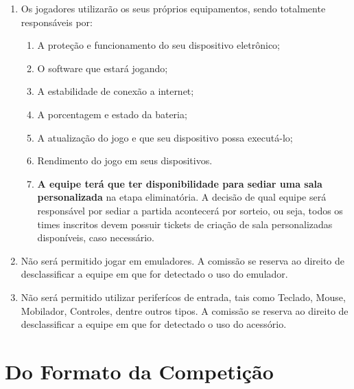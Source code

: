 \begin{enumerate}[start=1,label={\bfseries Art. \arabic*$^\circ$ - }, resume]
    \item Os jogadores utilizarão os seus próprios equipamentos, sendo totalmente
    responsáveis por:
\begin{enumerate}[label={\bfseries \Roman* - }]
        \item A proteção e funcionamento do seu dispositivo eletrônico;
        \item O software que estará jogando;
        \item A estabilidade de conexão a internet;
        \item A porcentagem e estado da bateria;
        \item A atualização do jogo e que seu dispositivo possa executá-lo;
        \item Rendimento do jogo em seus dispositivos.
        \item \textbf{A equipe terá que ter disponibilidade para sediar uma sala personalizada} na
            etapa eliminatória. A decisão de qual equipe será
            responsável por sediar a partida acontecerá por sorteio, ou seja,
            todos os times inscritos devem possuir tickets de criação de sala
            personalizadas disponíveis, caso necessário.
    \end{enumerate}

    \item Não será permitido jogar em emuladores. A comissão se reserva ao direito
        de desclassificar a equipe em que for detectado o uso do emulador.
    \item Não será permitido utilizar periferícos de entrada, tais como
        Teclado, Mouse, Mobilador, Controles, dentre outros tipos. A comissão se
        reserva ao direito de desclassificar a equipe em que for detectado o uso
        do acessório.
\end{enumerate}

\section*{Do Formato da Competição}
\label{sec:estrutura}

